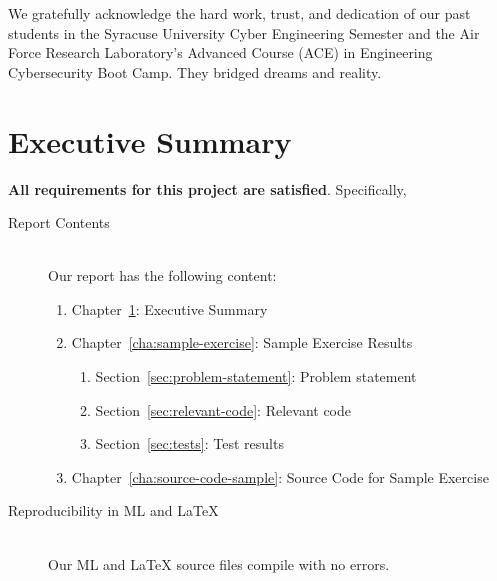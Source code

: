 \documentclass{report}
\begin{document}
\begin{acknowledgments}
  We gratefully acknowledge the hard work, trust, and dedication of
  our past students in the Syracuse University Cyber Engineering
  Semester and the Air Force Research Laboratory's Advanced Course
  (ACE) in Engineering Cybersecurity Boot Camp.  They bridged dreams
  and reality.
\end{acknowledgments}

\tableofcontents{}


\chapter{Executive Summary}
\label{cha:executive-summary}

\textbf{All requirements for this project are satisfied}.
Specifically,
\begin{description}
\item[Report Contents] \ \\
  Our report has the following content:
  \begin{enumerate}[{}]
  \item Chapter~\ref{cha:executive-summary}: Executive Summary
  \item Chapter~\ref{cha:sample-exercise}: Sample Exercise Results
    \begin{enumerate}[{}]
    \item Section~\ref{sec:problem-statement}: Problem statement
    \item Section~\ref{sec:relevant-code}: Relevant code
    \item Section~\ref{sec:tests}: Test results
    \end{enumerate}
  \item Chapter~\ref{cha:source-code-sample}: Source Code for Sample
    Exercise
  \end{enumerate}
\item[Reproducibility in ML and \LaTeX{}] \ \\
  Our ML and \LaTeX{} source files compile with no errors.
\end{description}

\end{document}
